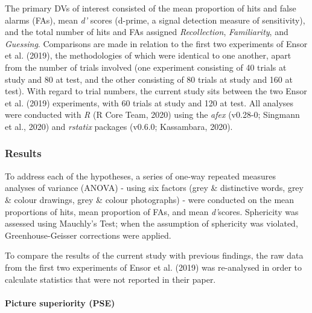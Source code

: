\documentclass[
  11pt,
]{article}
\begin{document}
The primary DVs of interest consisted of the mean proportion of hits and
false alarms (FAs), mean \emph{d'} scores (d-prime, a signal detection
measure of sensitivity), and the total number of hits and FAs assigned
\emph{Recollection}, \emph{Familiarity}, and \emph{Guessing}.
Comparisons are made in relation to the first two experiments of Ensor
et al. (2019), the methodologies of which were identical to one another,
apart from the number of trials involved (one experiment consisting of
40 trials at study and 80 at test, and the other consisting of 80 trials
at study and 160 at test). With regard to trial numbers, the current
study sits between the two Ensor et al. (2019) experiments, with 60
trials at study and 120 at test. All analyses were conducted with
\emph{R} (R Core Team, 2020) using the \emph{afex} (v0.28-0; Singmann et
al., 2020) and \emph{rstatix} packages (v0.6.0; Kassambara, 2020).

\hypertarget{results-4}{%
\subsubsection{Results}\label{results-4}}

To address each of the hypotheses, a series of one-way repeated measures
analyses of variance (ANOVA) - using six factors (grey \& distinctive
words, grey \& colour drawings, grey \& colour photographs) - were
conducted on the mean proportions of hits, mean proportion of FAs, and
mean \emph{d'}scores. Sphericity was assessed using Mauchly's Test; when
the assumption of sphericity was violated, Greenhouse-Geisser
corrections were applied.

To compare the results of the current study with previous findings, the
raw data from the first two experiments of Ensor et al. (2019) was
re-analysed in order to calculate statistics that were not reported in
their paper.

\newpage

\hypertarget{picture-superiority-pse}{%
\paragraph{Picture superiority (PSE)}\label{picture-superiority-pse}}
\end{document}
